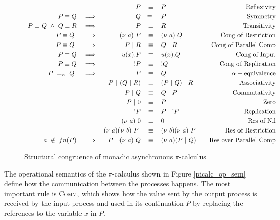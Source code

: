\documentclass[12pt,twoside]{report}
\begin{document}
\begin{figure}[h]
    \centering
    \begin{equation*}
    \centering
    \begin{array}{rcrclcr}
         & & P & \equiv & P & & \text{Reflexivity}\\[2.75pt]
         P \equiv Q & \implies & Q &\equiv\ & P & & \text{Symmetry}  \\[2.75pt]
         P \equiv Q\ \land\ Q \equiv R & \implies & P & \equiv & R & & \text{Transitivity} \\[2.75pt]
         P \equiv Q\ & \implies & (\nu\ a)\ P & \equiv & (\nu\ a)\ Q & & \text{Cong\ of\ Restriction} \\[2.75pt]
         P \equiv Q\ & \implies & P\ |\ R & \equiv & Q\ |\ R & & \text{Cong\ of\ Parallel\ Comp} \\[2.75pt]
         P \equiv Q & \implies & u(x).P & \equiv & u(x).Q & & \text{Cong\ of\ Input} \\[2.75pt]
         P \equiv Q & \implies & !P & \equiv & !Q & & \text{Cong\ of\ Replication} \\[2.75pt]
         P\ =_\alpha \ Q\ & \implies & P & \equiv & Q &  & \alpha-\text{equivalence} \\[2.75pt]
         & & P\ |\ (Q\ |\ R) & \equiv & (P\ |\ Q)\ |\ R & & \text{Associativity} \\[2.75pt]
         & & P\ |\ Q & \equiv & Q\ |\ P & & \text{Commutativity} \\[2.75pt]
         & & P\ |\ 0 & \equiv & P & & \text{Zero} \\[2.75pt]
         & & !P & \equiv & P\ |\ !P & & \text{Replication} \\[2.75pt]
         & & (\nu\ a)\ 0 & \equiv & 0 & & \text{Res\ of\ Nil} \\[2.75pt]
         & & (\nu\ a)(\nu\ b)\ P\ & \equiv & (\nu\ b)(\nu\ a)\ P & & \text{Res\ of\ Restriction} \\[2.75pt]
         a\ \notin\ fn(P) & \implies & \ P\ |\ (\nu\ a)\ Q & \equiv & (\nu\ a)(P\ |\ Q) & & \text{Res\ over\ Parallel\ Comp}
        \end{array}
    \end{equation*}
    \caption{Structural congruence of monadic asynchronous  $\pi$-calculus}
    \label{picalc_cong}
\end{figure}{}

The operational semantics of the $\pi$-calculus shown in Figure \ref{picalc_op_sem} define how the communication between the processes happens. The most important rule is \textsc{Comm}, which shows how the value sent by the output process is received by the input process and used in its continuation $P$ by replacing the references to the variable $x$ in $P$.\\
\end{document}
